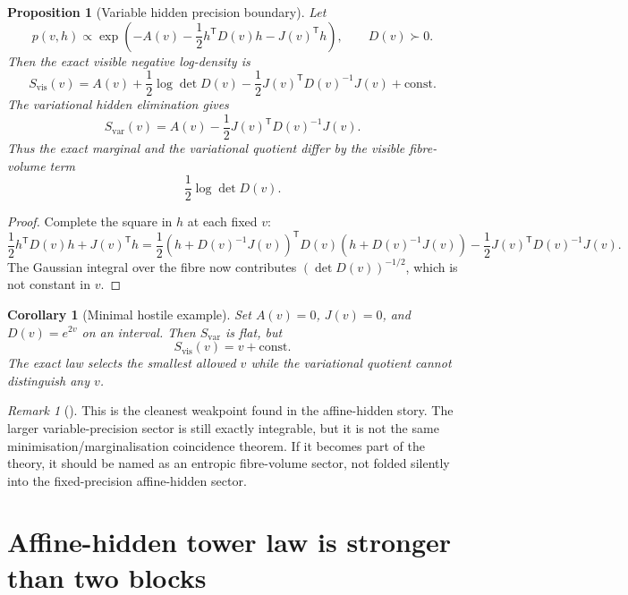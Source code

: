 \documentclass[11pt,a4paper]{article}
\numberwithin{equation}{section}
\theoremstyle{thmcompact}
\newtheorem{proposition}[theorem]{Proposition}
\newtheorem{corollary}[theorem]{Corollary}
\theoremstyle{remark}
\newtheorem*{remarkplain}{Remark}
\newenvironment{remark}[1][]%
{\begin{remarkbox}\begin{remarkplain}[#1]\normalfont}
{\end{remarkplain}\end{remarkbox}}
\begin{document}
\begin{proposition}[Variable hidden precision boundary]
\label{prop:variable-precision}
Let
\[
p(v,h)\propto
\exp\!\left(-A(v)-\frac12h^{\mathsf T}D(v)h-J(v)^{\mathsf T}h\right),
\qquad D(v)\succ0.
\]
Then the exact visible negative log-density is
\begin{equation}
S_{\mathrm{vis}}(v)
=A(v)+\frac12\log\det D(v)
-\frac12J(v)^{\mathsf T}D(v)^{-1}J(v)+\mathrm{const}.
\label{eq:variable-precision-visible}
\end{equation}
The variational hidden elimination gives
\begin{equation}
S_{\mathrm{var}}(v)
=A(v)-\frac12J(v)^{\mathsf T}D(v)^{-1}J(v).
\label{eq:variable-precision-var}
\end{equation}
Thus the exact marginal and the variational quotient differ by the visible fibre-volume term
\[
\frac12\log\det D(v).
\]
\end{proposition}

\begin{proof}
Complete the square in $h$ at each fixed $v$:
\[
\frac12h^{\mathsf T}D(v)h+J(v)^{\mathsf T}h
=
\frac12(h+D(v)^{-1}J(v))^{\mathsf T}D(v)(h+D(v)^{-1}J(v))
-\frac12J(v)^{\mathsf T}D(v)^{-1}J(v).
\]
The Gaussian integral over the fibre now contributes $(\det D(v))^{-1/2}$, which is not constant in $v$.
\end{proof}

\begin{corollary}[Minimal hostile example]
\label{cor:hostile-variable-precision}
Set $A(v)=0$, $J(v)=0$, and $D(v)=e^{2v}$ on an interval. Then $S_{\mathrm{var}}$ is flat, but
\[
S_{\mathrm{vis}}(v)=v+\mathrm{const}.
\]
The exact law selects the smallest allowed $v$ while the variational quotient cannot distinguish any $v$.
\end{corollary}

\begin{remark}
This is the cleanest weakpoint found in the affine-hidden story. The larger variable-precision sector is still exactly integrable, but it is not the same minimisation/marginalisation coincidence theorem. If it becomes part of the theory, it should be named as an entropic fibre-volume sector, not folded silently into the fixed-precision affine-hidden sector.
\end{remark}

\section{Affine-hidden tower law is stronger than two blocks}
\end{document}
